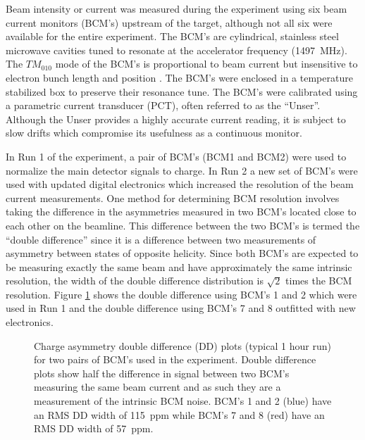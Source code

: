 Beam intensity or current was measured during the \Qs experiment using six beam current monitors (BCM's) upstream of the target, although not all six were available for the entire experiment. The BCM's are cylindrical, stainless steel microwave cavities tuned to resonate at the accelerator frequency (1497~MHz). The $TM_{010}$ mode of the BCM's is proportional to beam current but insensitive to electron bunch length and position \cite{Denard2001}. The BCM's were enclosed in a temperature stabilized box to preserve their resonance tune. The BCM's were calibrated using a parametric current transducer (PCT), often referred to as the ``Unser''. Although the Unser provides a highly accurate current reading, it is subject to slow drifts which compromise its usefulness as a continuous monitor.

In Run 1 of the \Qs experiment, a pair of BCM's (BCM1 and BCM2) were used to normalize the main detector signals to charge. In Run 2 a new set of BCM's were used with updated digital electronics which increased the resolution of the beam current measurements. One method for determining BCM resolution involves taking the difference in the asymmetries measured in two BCM's located close to each other on the beamline. This difference between the two BCM's is termed the ``double difference'' since it is a difference between two measurements of asymmetry between states of opposite helicity. Since both BCM's are expected to be measuring exactly the same beam and have approximately the same intrinsic resolution, the width of the double difference distribution is $\sqrt{2}$ times the BCM resolution. Figure \ref{fig:BCM_dd_width} shows the double difference using BCM's 1 and 2 which were used in Run 1 and the double difference using BCM's 7 and 8 outfitted with new electronics.

\begin{figure}[ht]
\centering
{}
\caption{Charge asymmetry double difference (DD) plots (typical 1 hour run) for two pairs of BCM's used in the \Qs experiment. Double difference plots show half the difference in signal between two BCM's measuring the same beam current and as such they are a measurement of the intrinsic BCM noise. BCM's 1 and 2 (blue) have an RMS DD width of 115~ppm while BCM's 7 and 8 (red) have an RMS DD width of 57~ppm.}
\label{fig:BCM_dd_width}
\end{figure}

